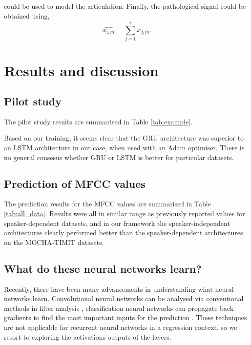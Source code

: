 \documentclass[a4paper]{article}
\begin{document}
\noindent could be used to model the articulation. Finally, the pathological signal could be obtained using,
\begin{equation*}
  {\hat{{x_{i,m}}}} = \sum_{j=1}^{i} x_{j,m}.
  \end{equation*}

\section{Results and discussion}

\subsection{Pilot study}

The pilot study results are summarised in Table \ref{tab:example}.

Based on our training, it seems clear that the GRU architecture was superior to an LSTM
architecture in our case, when used with an Adam optimiser.
There is no general consesus whether GRU or LSTM is better for particular
datasets. \cite{Jozefowicz2015}

\subsection{Prediction of MFCC values}

The prediction results for the MFCC values are summarised in Table
\ref{tab:all_data}. Results were all in similar range as previously
reported values for speaker-dependent datasets, and in our framework
the speaker-independent architectures clearly performed better than the
speaker-dependent architectures on the MOCHA-TIMIT datasets.

\subsection{What do these neural networks learn?} \label{section:visualisation}

Recently, there have been many advancements in understanding what neural networks learn.
Convolutional neural networks can be analysed via conventional methods in filter analysis \cite{Palaz2015},
classification neural networks can propagate back gradients to find the most important inputs for
the prediction \cite{Selvaraju2017}. These techniques are not applicable for recurrent neural networks in a regression
context, so we resort to exploring the activations outputs of the layers.
\end{document}
